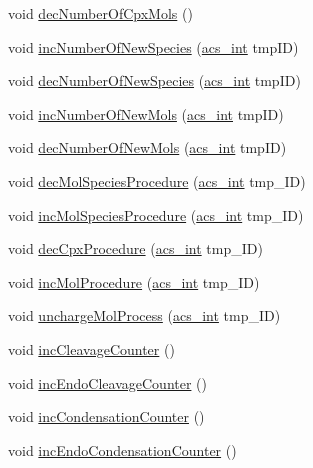 \begin{DoxyCompactItemize}
\item 
void \hyperlink{a00014_a756dc43b6b47498ba457613749324b15}{dec\-Number\-Of\-Cpx\-Mols} ()
\item 
void \hyperlink{a00014_a1055886a34a9a01ec37db31c69e460e0}{inc\-Number\-Of\-New\-Species} (\hyperlink{a00072_a8d277355641a098190360234e2ebde35}{acs\-\_\-int} tmp\-I\-D)
\item 
void \hyperlink{a00014_a5fa52a4f8e73a71fa41d3a1641e50535}{dec\-Number\-Of\-New\-Species} (\hyperlink{a00072_a8d277355641a098190360234e2ebde35}{acs\-\_\-int} tmp\-I\-D)
\item 
void \hyperlink{a00014_a1addb84f0c8d391f97ad2347a64208bb}{inc\-Number\-Of\-New\-Mols} (\hyperlink{a00072_a8d277355641a098190360234e2ebde35}{acs\-\_\-int} tmp\-I\-D)
\item 
void \hyperlink{a00014_ae9bbd78076706050ced4dd7fb99036f1}{dec\-Number\-Of\-New\-Mols} (\hyperlink{a00072_a8d277355641a098190360234e2ebde35}{acs\-\_\-int} tmp\-I\-D)
\item 
void \hyperlink{a00014_a10fad450cf5ef3a1c7cf75d616105069}{dec\-Mol\-Species\-Procedure} (\hyperlink{a00072_a8d277355641a098190360234e2ebde35}{acs\-\_\-int} tmp\-\_\-\-I\-D)
\item 
void \hyperlink{a00014_a7e0e11e36d7bcd6ef438c426aa8754a0}{inc\-Mol\-Species\-Procedure} (\hyperlink{a00072_a8d277355641a098190360234e2ebde35}{acs\-\_\-int} tmp\-\_\-\-I\-D)
\item 
void \hyperlink{a00014_a16d09f818d3012f88e8e4c9a7759b6bd}{dec\-Cpx\-Procedure} (\hyperlink{a00072_a8d277355641a098190360234e2ebde35}{acs\-\_\-int} tmp\-\_\-\-I\-D)
\item 
void \hyperlink{a00014_a094499a0f1bb3c2342a3b16944f5280d}{inc\-Mol\-Procedure} (\hyperlink{a00072_a8d277355641a098190360234e2ebde35}{acs\-\_\-int} tmp\-\_\-\-I\-D)
\item 
void \hyperlink{a00014_af21c066ce18c8a39740f66a995782fb9}{uncharge\-Mol\-Process} (\hyperlink{a00072_a8d277355641a098190360234e2ebde35}{acs\-\_\-int} tmp\-\_\-\-I\-D)
\item 
void \hyperlink{a00014_a480887ed06f63d34e014c19ea302d3d5}{inc\-Cleavage\-Counter} ()
\item 
void \hyperlink{a00014_ab0fc2cd6ed209d61286b837bd5460d90}{inc\-Endo\-Cleavage\-Counter} ()
\item 
void \hyperlink{a00014_a3fae8e57fad9ef5b182e32d9bb9989af}{inc\-Condensation\-Counter} ()
\item 
void \hyperlink{a00014_a01812d540519696ab07c9f822119cc64}{inc\-Endo\-Condensation\-Counter} ()

\end{DoxyCompactItemize}
